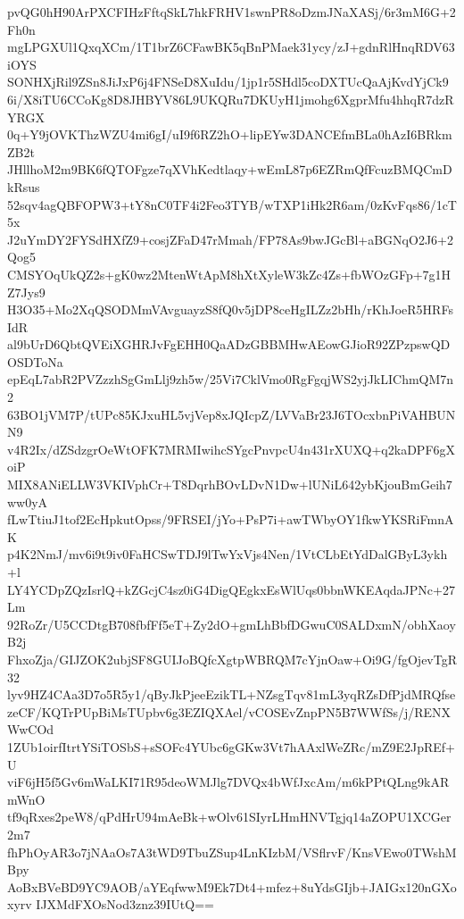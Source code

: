 pvQG0hH90ArPXCFIHzFftqSkL7hkFRHV1swnPR8oDzmJNaXASj/6r3mM6G+2Fh0n
mgLPGXUl1QxqXCm/1T1brZ6CFawBK5qBnPMaek31ycy/zJ+gdnRlHnqRDV63iOYS
SONHXjRil9ZSn8JiJxP6j4FNSeD8XuIdu/1jp1r5SHdl5coDXTUcQaAjKvdYjCk9
6i/X8iTU6CCoKg8D8JHBYV86L9UKQRu7DKUyH1jmohg6XgprMfu4hhqR7dzRYRGX
0q+Y9jOVKThzWZU4mi6gI/uI9f6RZ2hO+lipEYw3DANCEfmBLa0hAzI6BRkmZB2t
JHllhoM2m9BK6fQTOFgze7qXVhKedtlaqy+wEmL87p6EZRmQfFcuzBMQCmDkRsus
52sqv4agQBFOPW3+tY8nC0TF4i2Feo3TYB/wTXP1iHk2R6am/0zKvFqs86/1cT5x
J2uYmDY2FYSdHXfZ9+cosjZFaD47rMmah/FP78As9bwJGcBl+aBGNqO2J6+2Qog5
CMSYOqUkQZ2s+gK0wz2MtenWtApM8hXtXyleW3kZc4Zs+fbWOzGFp+7g1HZ7Jys9
H3O35+Mo2XqQSODMmVAvguayzS8fQ0v5jDP8ceHgILZz2bHh/rKhJoeR5HRFsIdR
al9bUrD6QbtQVEiXGHRJvFgEHH0QaADzGBBMHwAEowGJioR92ZPzpswQDOSDToNa
epEqL7abR2PVZzzhSgGmLlj9zh5w/25Vi7CklVmo0RgFgqjWS2yjJkLIChmQM7n2
63BO1jVM7P/tUPc85KJxuHL5vjVep8xJQIcpZ/LVVaBr23J6TOcxbnPiVAHBUNN9
v4R2Ix/dZSdzgrOeWtOFK7MRMIwihcSYgcPnvpcU4n431rXUXQ+q2kaDPF6gXoiP
MIX8ANiELLW3VKIVphCr+T8DqrhBOvLDvN1Dw+lUNiL642ybKjouBmGeih7ww0yA
fLwTtiuJ1tof2EcHpkutOpss/9FRSEI/jYo+PsP7i+awTWbyOY1fkwYKSRiFmnAK
p4K2NmJ/mv6i9t9iv0FaHCSwTDJ9lTwYxVjs4Nen/1VtCLbEtYdDalGByL3ykh+l
LY4YCDpZQzIsrlQ+kZGcjC4sz0iG4DigQEgkxEsWlUqs0bbnWKEAqdaJPNc+27Lm
92RoZr/U5CCDtgB708fbfFf5eT+Zy2dO+gmLhBbfDGwuC0SALDxmN/obhXaoyB2j
FhxoZja/GIJZOK2ubjSF8GUIJoBQfcXgtpWBRQM7cYjnOaw+Oi9G/fgOjevTgR32
lyv9HZ4CAa3D7o5R5y1/qByJkPjeeEzikTL+NZsgTqv81mL3yqRZsDfPjdMRQfse
zeCF/KQTrPUpBiMsTUpbv6g3EZIQXAel/vCOSEvZnpPN5B7WWfSs/j/RENXWwCOd
1ZUb1oirfItrtYSiTOSbS+sSOFc4YUbc6gGKw3Vt7hAAxlWeZRc/mZ9E2JpREf+U
viF6jH5f5Gv6mWaLKI71R95deoWMJlg7DVQx4bWfJxcAm/m6kPPtQLng9kARmWnO
tf9qRxes2peW8/qPdHrU94mAeBk+wOlv61SIyrLHmHNVTgjq14aZOPU1XCGer2m7
fhPhOyAR3o7jNAaOs7A3tWD9TbuZSup4LnKIzbM/VSflrvF/KnsVEwo0TWshMBpy
AoBxBVeBD9YC9AOB/aYEqfwwM9Ek7Dt4+mfez+8uYdsGIjb+JAIGx120nGXoxyrv
IJXMdFXOsNod3znz39IUtQ==
